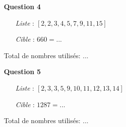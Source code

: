 \documentclass[a4paper,12pt]{article}
\begin{document}
\textbf{Question 4} \\
\begin{itemize}
	\setlength\itemsep{0.3em}
	\item[\textit{Liste}]: $[2, 2, 3, 4, 5, 7, 9, 11, 15]$
	\item[\textit{Cible}]: $660 = ...$
\end{itemize}
\vspace{0.2cm}
Total de nombres utilisés: ...
\vspace{0.8cm}

\textbf{Question 5} \\
\begin{itemize}
	\setlength\itemsep{0.3em}
	\item[\textit{Liste}]: $[2, 3, 3, 5, 9, 10, 11, 12, 13, 14]$
	\item[\textit{Cible}]: $1287 = ...$
\end{itemize}
\vspace{0.2cm}
Total de nombres utilisés: ...
\end{document}
